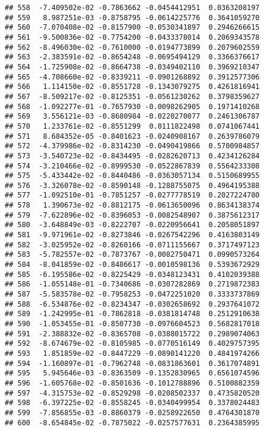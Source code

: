 \documentclass[
]{article}
\begin{document}
\begin{verbatim}
## 558  -7.409502e-02 -0.7863662 -0.0454412951  0.0363208197
## 559   8.987251e-03 -0.8758795 -0.0614225776  0.3641059270
## 560  -7.070408e-02 -0.8157900 -0.0530341897  0.2946266615
## 561  -9.500836e-02 -0.7754200 -0.0433378014  0.2069343578
## 562  -8.496030e-02 -0.7610000 -0.0194773899  0.2079602559
## 563  -2.383591e-02 -0.8654248 -0.0695494129  0.3366376617
## 564  -1.725908e-02 -0.8664738 -0.0349402110  0.3969210347
## 565  -4.708660e-02 -0.8339211 -0.0901268892  0.3912577306
## 566   1.114150e-02 -0.8551728 -0.1343079275  0.4261816941
## 567  -8.509217e-02 -0.8125351 -0.0561230262  0.3798359627
## 568  -1.092277e-01 -0.7657930 -0.0098262905  0.1971410268
## 569   3.556121e-03 -0.8680984 -0.0220270077  0.2461306787
## 570   1.233761e-02 -0.8551299  0.0111822498  0.0741067441
## 571   8.684352e-05 -0.8401623 -0.0240908167  0.2639786079
## 572  -4.379986e-02 -0.8314230 -0.0490419866  0.5700984857
## 573  -3.540723e-02 -0.8434495 -0.0282620713  0.4234126284
## 574  -3.210466e-02 -0.8999530 -0.0522867839  0.5564233308
## 575  -5.433442e-02 -0.8440486 -0.0363057134  0.5150689955
## 576  -3.326078e-02 -0.8590148 -0.1288755075  0.4964195388
## 577  -1.092510e-01 -0.7851257 -0.0277778519  0.2027224780
## 578   1.390673e-02 -0.8812175 -0.0613650096  0.8634138374
## 579  -7.622896e-02 -0.8396053 -0.0082548907  0.3875612317
## 580  -3.648849e-03 -0.8222707 -0.0220956641  0.2058051897
## 581  -9.971961e-02 -0.8273846 -0.0267542296  0.4163803149
## 582  -3.025952e-02 -0.8260166 -0.0711155667  0.3717497123
## 583  -5.782557e-02 -0.7873767 -0.0082750471  0.0990573264
## 584  -8.041859e-02 -0.8486617 -0.0010598136  0.5393672929
## 585  -6.195586e-02 -0.8225429 -0.0348123431  0.4102039388
## 586  -1.055148e-01 -0.7340686 -0.0307282869  0.2719872383
## 587  -5.583578e-02 -0.7958253 -0.0472251020  0.3333737869
## 588  -6.534876e-02 -0.8234347 -0.0302658692  0.2937641072
## 589  -1.242995e-01 -0.7862818 -0.0381814748  0.2512910638
## 590  -1.053455e-01 -0.8507730 -0.0976604523  0.5682817018
## 591  -2.388832e-02 -0.8365708 -0.0388015722  0.2989074063
## 592  -8.674679e-02 -0.8105985 -0.0770516149  0.4029757395
## 593   1.851859e-02 -0.8447229 -0.0890141220  0.4841974266
## 594  -1.160897e-01 -0.7962748 -0.0831863601  0.3617074891
## 595   5.945646e-03 -0.8363509 -0.1352830965  0.6561074596
## 596  -1.605768e-02 -0.8501636 -0.1012788896  0.5100882359
## 597  -4.315753e-02 -0.8529298 -0.0208502337  0.4735820520
## 598  -6.397225e-02 -0.8558245 -0.0340499954  0.3378024483
## 599  -7.856855e-03 -0.8860379 -0.0258922650  0.4764301870
## 600  -8.654845e-02 -0.7875022 -0.0257577631  0.2364385995

\end{verbatim}
\end{document}
